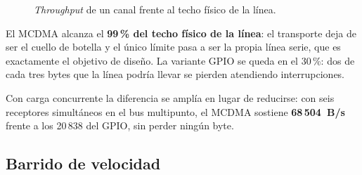 \begin{figure}[htbp]
    \centering
    \caption{\textit{Throughput} de un canal frente al techo físico de la línea.}
    \label{fig:bench_throughput}
\end{figure}

El MCDMA alcanza el \textbf{99\,\% del techo físico de la línea}: el transporte deja de ser el
cuello de botella y el único límite pasa a ser la propia línea serie, que es exactamente el
objetivo de diseño. La variante GPIO se queda en el 30\,\%: dos de cada tres bytes que la línea
podría llevar se pierden atendiendo interrupciones.

Con carga concurrente la diferencia se amplía en lugar de reducirse: con seis receptores
simultáneos en el bus multipunto, el MCDMA sostiene \textbf{68\,504~B/s} frente a los 20\,838 del
GPIO, sin perder ningún byte.

\subsection{Barrido de velocidad}

